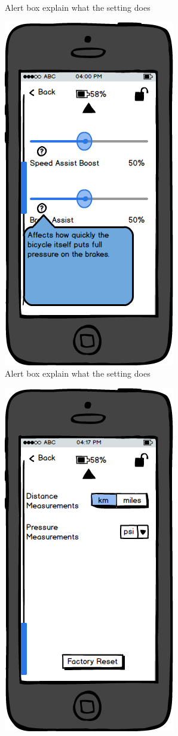 \documentclass[a4paper]{report}
\begin{document}
{\begin{figure}
\caption{Alert box explain what the setting does}
\end{figure}
\clearpage
\begin{figure}
\centering
\includegraphics[scale=0.9]{figures/prototype_1/settings_help_3}
\caption{Alert box explain what the setting does}
\end{figure}
\clearpage
\begin{figure}
\centering
\includegraphics[scale=0.9]{figures/prototype_1/settings_2}

\end{figure}}
\end{document}
